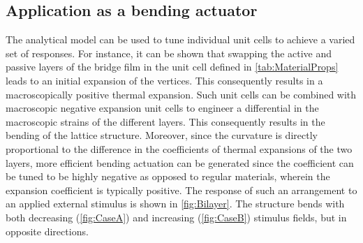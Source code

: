 \documentclass[final,times,5p]{elsarticle}
\numberwithin{equation}{section}
\begin{document}
\subsection{Application as a bending actuator}
The analytical model can be used to tune individual unit cells to achieve a varied set of responses. For instance, it can be shown that swapping the active and passive layers of the bridge film in the unit cell defined in \cref{tab:MaterialProps} leads to an initial expansion of the vertices. This consequently results in a macroscopically positive thermal expansion. Such unit cells can be combined with macroscopic negative expansion unit cells to engineer a differential in the macroscopic strains of the different layers. This consequently results in the bending of the lattice structure. Moreover, since the curvature is directly proportional to the difference in the coefficients of thermal expansions of the two layers, more efficient bending actuation can be generated since the coefficient can be tuned to be highly negative as opposed to regular materials, wherein the expansion coefficient is typically positive. The response of such an arrangement to an applied external stimulus is shown in \cref{fig:Bilayer}. The structure bends with both decreasing (\cref{fig:CaseA}) and increasing (\cref{fig:CaseB}) stimulus fields, but in opposite directions.


 \begin{figure*}[htpb!]
\begin{center}
    \hspace{0.1\textwidth}
\end{center}
    \caption{Bending of the bilayer lattice with its upper rows consisting of reversed response unit cells and its lower rows comprising regular response unit cells under (a) a negative temperature differential and (b) a positive temperature differential. The undeformed and deformed configurations are shown in grey and green, respectively.}
    \label{fig:Bilayer}
 \end{figure*}

\end{document}
